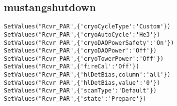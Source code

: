 \subsection{mustangshutdown}
\begin{lstlisting}
SetValues("Rcvr_PAR",{'cryoCycleType':'Custom'})
SetValues("Rcvr_PAR",{'cryoAutoCycle':'He3'})
SetValues("Rcvr_PAR",{'cryoDAQPowerSafety':'On'})
SetValues("Rcvr_PAR",{'cryoDAQPower':'Off'})
SetValues("Rcvr_PAR",{'cryoTowerPower':'Off'})
SetValues("Rcvr_PAR",{'fireCal':'Off'})
SetValues("Rcvr_PAR",{'hlDetBias,column':'all'})
SetValues("Rcvr_PAR",{'hlDetBias,value':'0'})
SetValues("Rcvr_PAR",{'scanType':'Default'})
SetValues("Rcvr_PAR",{'state':'Prepare'})
\end{lstlisting}

